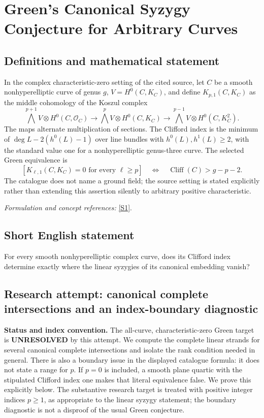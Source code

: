 \documentclass[11pt]{article}
\begin{document}
\section*{\texorpdfstring{Green’s Canonical Syzygy Conjecture for Arbitrary Curves}{Green’s Canonical Syzygy Conjecture for Arbitrary Curves}}\label{statement}
\subsection{Definitions and mathematical statement}
In the complex characteristic-zero setting of the cited source, let $C$ be a smooth nonhyperelliptic curve of genus $g$, $V=H^0(C,K_C)$, and define $K_{p,1}(C,K_C)$ as the middle cohomology of the Koszul complex
\[
 \bigwedge^{p+1}V\otimes H^0(C,\mathcal O_C)
 \longrightarrow\bigwedge^pV\otimes H^0(C,K_C)
 \longrightarrow\bigwedge^{p-1}V\otimes H^0(C,K_C^2).
\]
The maps alternate multiplication of sections. The Clifford index is the minimum of $\deg L-2(h^0(L)-1)$ over line bundles with $h^0(L),h^1(L)\ge2$, with the standard value one for a nonhyperelliptic genus-three curve. The selected Green equivalence is
\[
 [K_{\ell,1}(C,K_C)=0\text{ for every }\ell\ge p]
 \quad\Longleftrightarrow\quad\operatorname{Cliff}(C)>g-p-2.
\]
The catalogue does not name a ground field; the source setting is stated explicitly rather than extending this assertion silently to arbitrary positive characteristic.
\par\smallskip\textit{Formulation and concept references:} \href{https://webusers.imj-prg.fr/~claire.voisin/Articlesweb/syzod.pdf}{[S1]}.

\subsection{Short English statement}
For every smooth nonhyperelliptic complex curve, does its Clifford index determine exactly where the linear syzygies of its canonical embedding vanish?
\subsection{Research attempt: canonical complete intersections and an index-boundary diagnostic}
\textbf{Status and index convention.} The all-curve, characteristic-zero Green target is \textbf{UNRESOLVED} by this attempt. We compute the complete linear strands for several canonical complete intersections and isolate the rank condition needed in general. There is also a boundary issue in the displayed catalogue formula: it does not state a range for $p$. If $p=0$ is included, a smooth plane quartic with the stipulated Clifford index one makes that literal equivalence false. We prove this explicitly below. The substantive research target is treated with positive integer indices $p\ge1$, as appropriate to the linear syzygy statement; the boundary diagnostic is not a disproof of the usual Green conjecture.
\end{document}
